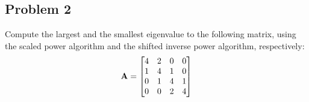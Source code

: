 \subsection{Problem 2}%
\label{sec:problem_2}
Compute the largest and the smallest eigenvalue to the following matrix, using the
scaled power algorithm and the shifted inverse power algorithm, respectively:
\begin{equation*}
    \mathbf{A} = 
    \begin{bmatrix}
        4 & 2 & 0 & 0 \\
        1 & 4 & 1 & 0 \\
        0 & 1 & 4 & 1 \\
        0 & 0 & 2 & 4
    \end{bmatrix}
\end{equation*}

